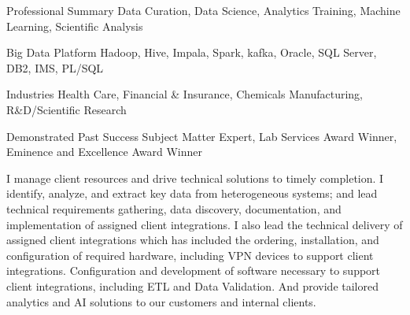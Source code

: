 

\begin{cvskills}

  \cvskill
    {Professional Summary} %
    {Data Curation, Data Science, Analytics Training, Machine Learning, Scientific Analysis} %

  \cvskill
    {Big Data Platform} %
    {Hadoop, Hive, Impala, Spark, kafka, Oracle, SQL Server, DB2, IMS, PL/SQL} %

  \cvskill
    {Industries} %
    {Health Care, Financial \& Insurance, Chemicals Manufacturing, R\&D/Scientific Research} %

  \cvskill
    {Demonstrated Past Success} %
    {Subject Matter Expert, Lab Services Award Winner, Eminence and Excellence Award Winner} %

\end{cvskills}

\begin{cvparagraph}
  I manage client resources and drive technical solutions to timely completion.  I identify, analyze, and extract key data from heterogeneous systems; and lead technical requirements gathering, data discovery, documentation, and implementation of assigned client integrations.  I also lead the technical delivery of assigned client integrations which has included the ordering, installation, and configuration of required hardware, including VPN devices to support client integrations.  Configuration and development of software necessary to support client integrations, including ETL and Data Validation.  And provide tailored analytics and AI solutions to our customers and internal clients.
\end{cvparagraph}
    
